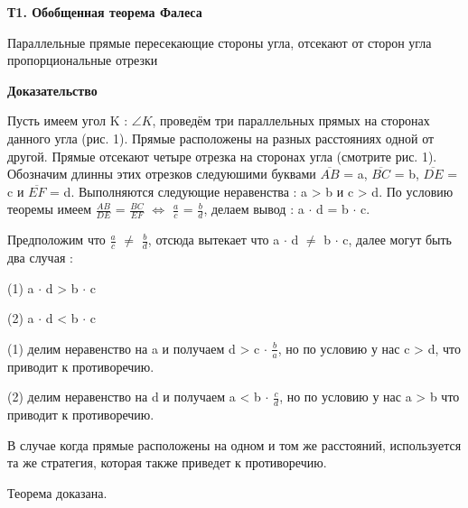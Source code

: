 \documentclass{amsart}
\begin{document}
\textbf{Т1. Обобщенная теорема Фалеса}

Параллельные прямые пересекающие стороны угла, отсекают от сторон угла пропорциональные отрезки

\textbf{Доказательство}

Пусть имеем угол K : $\angle K$, проведём три параллельных прямых на сторонах данного угла (рис. 1). Прямые расположены на разных расстояниях одной от другой. Прямые отсекают четыре отрезка на сторонах угла (смотрите рис. 1). Обозначим длинны этих отрезков следуюшими буквами $\overline{AB}$ = a, $\overline{BC}$ = b, $\overline{DE}$ = c и $\overline{EF}$ = d. Выполняются следующие неравенства : a > b и c > d.  По условию теоремы имеем $\frac{AB}{DE}$ = $\frac{BC}{EF}$ $\Leftrightarrow$ $\frac{a}{c}$ = $\frac{b}{d}$, делаем вывод : a $\cdot$ d = b $\cdot$ c.

Предположим что $\frac{a}{c}$ $\neq$ $\frac{b}{d}$, отсюда вытекает что a $\cdot$ d $\neq$ b $\cdot$ c, далее могут быть два случая :

(1) a $\cdot$ d > b $\cdot$ c

(2) a $\cdot$ d < b $\cdot$ c

(1) делим неравенство на a и получаем d > c $\cdot$ $\frac{b}{a}$, но по условию у нас c > d, что приводит к противоречию.

(2) делим неравенство на d и получаем a < b $\cdot$ $\frac{c}{d}$,  но по условию у нас a > b что приводит к противоречию.

В случае когда прямые расположены на одном и том же расстояний, используется та же стратегия, которая также приведет к противоречию.

Теорема доказана.
\end{document}
